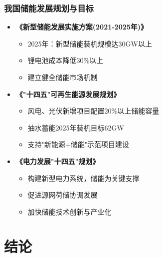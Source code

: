 \documentclass[aspectratio=169]{beamer}
\begin{document}
\begin{frame}
    \frametitle{我国储能发展规划与目标}
    \begin{itemize}
        \item \textbf{《新型储能发展实施方案(2021-2025年)》} \cite{ref1}
        \begin{itemize}
            \item 2025年：新型储能装机规模达30GW以上
            \item 锂电池成本降低30\%以上
            \item 建立健全储能市场机制
        \end{itemize}
        
        \item \textbf{《"十四五"可再生能源发展规划》} \cite{ref2}
        \begin{itemize}
            \item 风电、光伏新增项目配置20\%以上储能容量
            \item 抽水蓄能2025年装机目标62GW \cite{ref8}
            \item 支持"新能源+储能"示范项目建设
        \end{itemize}
        
        \item \textbf{《电力发展"十四五"规划》}
        \begin{itemize}
            \item 构建新型电力系统，储能为关键支撑
            \item 促进源网荷储协调发展
            \item 加快储能技术创新与产业化
        \end{itemize}
    \end{itemize}
\end{frame}

\section{结论}
\end{document}
